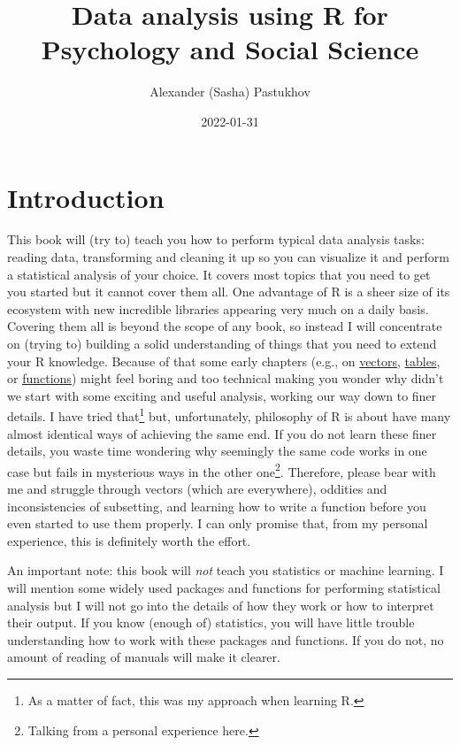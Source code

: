 \documentclass[
]{book}
\title{Data analysis using R for Psychology and Social Science}
\author{Alexander (Sasha) Pastukhov}
\date{2022-01-31}
\begin{document}
\maketitle

{
\setcounter{tocdepth}{1}
\tableofcontents
}
\hypertarget{introduction}{%
\chapter*{Introduction}\label{introduction}}

This book will (try to) teach you how to perform typical data analysis tasks: reading data, transforming and cleaning it up so you can visualize it and perform a statistical analysis of your choice. It covers most topics that you need to get you started but it cannot cover them all. One advantage of R is a sheer size of its ecosystem with new incredible libraries appearing very much on a daily basis. Covering them all is beyond the scope of any book, so instead I will concentrate on (trying to) building a solid understanding of things that you need to extend your R knowledge. Because of that some early chapters (e.g., on \protect\hyperlink{vectors}{vectors}, \protect\hyperlink{tables}{tables}, or \protect\hyperlink{ux5cux23functions}{functions}) might feel boring and too technical making you wonder why didn't we start with some exciting and useful analysis, working our way down to finer details. I have tried that\footnote{As a matter of fact, this was my approach when learning R.} but, unfortunately, philosophy of R is about have many almost identical ways of achieving the same end. If you do not learn these finer details, you waste time wondering why seemingly the same code works in one case but fails in mysterious ways in the other one\footnote{Talking from a personal experience here.}. Therefore, please bear with me and struggle through vectors (which are everywhere), oddities and inconsistencies of subsetting, and learning how to write a function before you even started to use them properly. I can only promise that, from my personal experience, this is definitely worth the effort.

An important note: this book will \emph{not} teach you statistics or machine learning. I will mention some widely used packages and functions for performing statistical analysis but I will not go into the details of how they work or how to interpret their output. If you know (enough of) statistics, you will have little trouble understanding how to work with these packages and functions. If you do not, no amount of reading of manuals will make it clearer.
\end{document}
